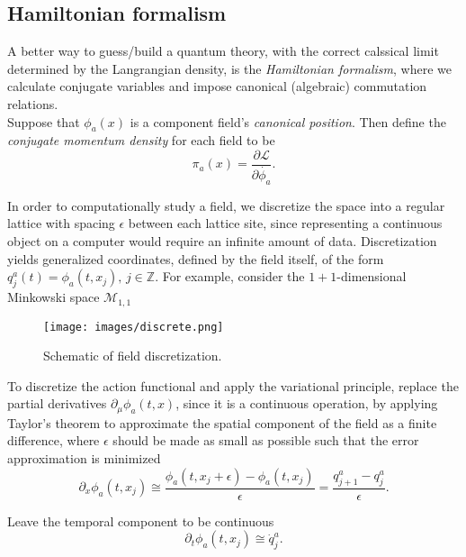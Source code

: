 \subsection*{Hamiltonian formalism}

\noindent A better way to guess/build a quantum theory, with the correct calssical limit determined by the Langrangian density, is the \textit{Hamiltonian formalism}, where we calculate conjugate variables and impose canonical (algebraic) commutation relations. \\

\noindent Suppose that $\phi_a(x)$ is a component field's \textit{canonical position}. Then define the \textit{conjugate momentum density} for each field to be 
\begin{equation}
\pi_a(x) = \frac{\partial \mathscr{L}}{\partial \dot{\phi_a}}.
\end{equation}

\noindent In order to computationally study a field, we discretize the space into a regular lattice with spacing $\epsilon$ between each lattice site, since representing a continuous object on a computer would require an infinite amount of data. Discretization yields generalized coordinates, defined by the field itself, of the form $q_j^a(t) = \phi_a(t, x_j), \, j \in \mathbb{Z}$. For example, consider the $1+1$-dimensional Minkowski space $\mathcal{M}_{1,1}$

\begin{figure}[H]
	\centering
	\texttt{[image: images/discrete.png]}
	\caption{Schematic of field discretization.}
	\label{fig:fig3}
\end{figure}

\noindent To discretize the action functional and apply the variational principle, replace the partial derivatives $\partial_\mu \phi_a(t, x)$, since it is a continuous operation, by applying Taylor's theorem to approximate the spatial component of the field as a finite difference, where $\epsilon$ should be made as small as possible such that the error approximation is minimized
\begin{equation}
\partial_x \phi_a(t, x_j) \cong \frac{\phi_a(t, x_j + \epsilon) - \phi_a(t, x_j)}{\epsilon} = \frac{q^a_{j+1} - q^a_j}{\epsilon}.
\end{equation}

\noindent Leave the temporal component to be continuous
\begin{equation}
\partial_t \phi_a(t, x_j) \cong \dot{q}_j^a . 
\end{equation}


